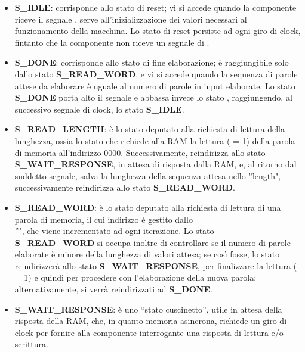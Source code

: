 \begin{itemize}
    \item \textbf{S\_IDLE}: corrisponde allo stato di reset; vi si accede quando la componente riceve il segnale , serve all’inizializzazione dei valori necessari al funzionamento della macchina. Lo stato di reset persiste ad ogni giro di clock, fintanto che la componente non riceve un segnale di .
    
    \item \textbf{S\_DONE}: corrisponde allo stato di fine elaborazione; è raggiungibile solo dallo stato \textbf{S\_READ\_WORD}, e vi si accede quando la sequenza di parole attese da elaborare è uguale al numero di parole in input elaborate. Lo stato \textbf{S\_DONE} porta alto il segnale  e abbassa invece lo stato , raggiungendo, al successivo segnale di clock, lo stato \textbf{S\_IDLE}.
    
    \item \textbf{S\_READ\_LENGTH}: è lo stato deputato alla richiesta di lettura della lunghezza, ossia lo stato che richiede alla RAM la lettura ( = 1) della parola di memoria all’indirizzo 0000. Successivamente, reindirizza allo stato \textbf{S\_WAIT\_RESPONSE}, in attesa di risposta dalla RAM, e, al ritorno dal suddetto segnale, salva la lunghezza della sequenza attesa nello  ”length", successivamente reindirizza allo stato \textbf{S\_READ\_WORD}.
    
    \item \textbf{S\_READ\_WORD}: è lo stato deputato alla richiesta di lettura di una parola di memoria, il cui indirizzo è gestito dallo  \\ ”", che viene incrementato ad ogni iterazione. Lo stato \\ \textbf{S\_READ\_WORD} si occupa inoltre di controllare se il numero di parole elaborate è minore della lunghezza di valori attesa; se così fosse, lo stato reindirizzerà allo stato \textbf{S\_WAIT\_RESPONSE}, per finalizzare la lettura ( = 1) e quindi per procedere con l'elaborazione della nuova parola; alternativamente, si verrà reindirizzati ad \textbf{S\_DONE}.
    
    \item \textbf{S\_WAIT\_RESPONSE}: è uno “stato cuscinetto”, utile in attesa della risposta della RAM, che, in quanto memoria asincrona, richiede un giro di clock per fornire alla componente interrogante una risposta di lettura e/o scrittura.
    

\end{itemize}
